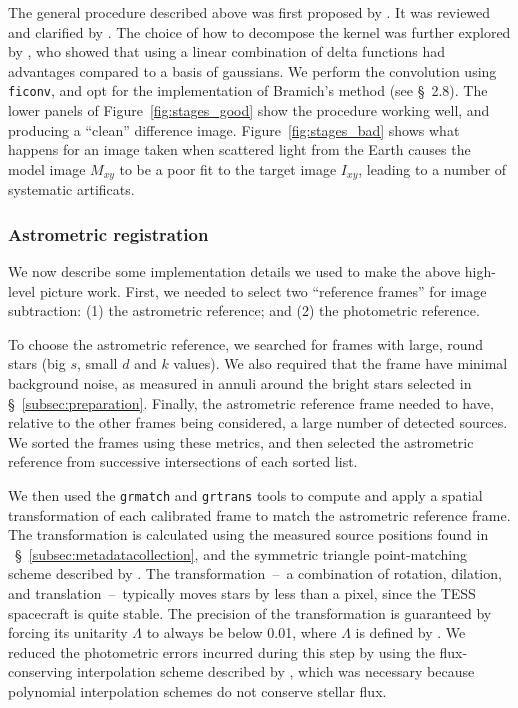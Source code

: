 \documentclass[12pt,twocolumn,tighten]{aastex62}
\begin{document}
The general procedure described above was first proposed by \citet{Alard_Lupton_1998}.
It was reviewed and clarified by \citet{miller_optimal_2008}.
The choice of how to decompose the kernel was further explored by
\citet{bramich_new_2008}, who showed that using a linear combination
of delta functions had advantages compared to a basis of gaussians.
We perform the convolution using \texttt{ficonv}, and opt for the
implementation of Bramich's method (see \citealt{Pal_2009} \S~2.8).
The lower panels of
Figure~\ref{fig:stages_good} show the procedure
working well, and producing a ``clean'' difference image.
Figure~\ref{fig:stages_bad} shows what happens for an
image taken when scattered light from the Earth causes the
model image $M_{xy}$ to be a poor fit to the target image $I_{xy}$, 
leading to a number of systematic artificats.


\subsubsection{Astrometric registration}
We now describe some implementation details we used to make the
above high-level picture work.
First, we needed to select two ``reference frames'' for image subtraction:
(1) the astrometric reference; and (2) the photometric reference.

To choose the astrometric reference, we searched for frames with
large, round stars (big $s$, small $d$ and $k$ values).
We also required
that the frame have minimal background noise, as measured in annuli
around the bright stars selected in \S~\ref{subsec:preparation}.
Finally, the astrometric reference frame needed to have, relative to the 
other frames being
considered, a large number of detected sources.
We sorted the frames using these metrics, and then selected the
astrometric reference from successive intersections of each sorted
list.

We then
used the \texttt{grmatch} and \texttt{grtrans} tools to
compute and apply a spatial transformation of each calibrated frame
to match the astrometric reference frame.
The transformation is calculated using the measured source positions
found in ~\S~\ref{subsec:metadatacollection},
and the symmetric triangle point-matching scheme described
by \citet[][~\S~2.5.2]{Pal_2009}.
The transformation~--~a combination of rotation, dilation, and
translation~--~typically moves stars by less than a pixel, since
the TESS spacecraft is quite stable.
The precision of the transformation is guaranteed by forcing 
its unitarity $\Lambda$ to always be below 0.01, where 
$\Lambda$ is defined by \citet[][~Eq.~54]{Pal_2009}.
We reduced the photometric errors
incurred during this step by using
the flux-conserving interpolation
scheme described by \citet{Pal_2009},
which was necessary because polynomial interpolation schemes
do not conserve stellar flux. 
\end{document}
